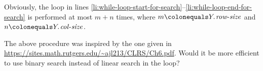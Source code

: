 \begin{enumerate}[\thechapter-1]
\begin{enumerate}[\it a.]
\begin{codebox}
    \End
\end{codebox}
Obviously, the  loop in lines \ref{li:while-loop-start-for-search}--\ref{li:while-loop-end-for-search} is performed at most $m + n$ times, where $m \defas \attrib{Y}{row-size}$ and $n \defas \attrib{Y}{col-size}$.
\begin{remark}
The above procedure was inspired by the one given in \url{https://sites.math.rutgers.edu/~ajl213/CLRS/Ch6.pdf}. Would it be more efficient to use binary search instead of linear search in the  loop?
\end{remark}
\end{enumerate}
%
\end{enumerate}